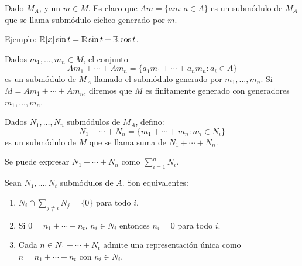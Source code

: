\begin{df}
  Dado \(M_A\), y un \(m\in M\). Es claro que
  \(Am=\{am:a\in A\}\) es un submódulo de \(M_A\) que se llama submódulo
  cíclico generado por \(m\).
\end{df}

Ejemplo: \(\mathbb{R}[x]\sin t=\mathbb{R}\sin t+\mathbb{R}\cos t\).

\begin{df}
  Dados \(m_1,\ldots, m_n\in M\), el conjunto
  \[
    Am_1+\cdots+Am_n=\{a_1 m_1+\cdots+a_n m_n: a_i\in A\}
  \]
  es un submódulo de \(M_A\) llamado el submódulo generado por
  \(m_1,\ldots, m_n\).
  Si \(M=Am_1+\cdots+Am_n\), diremos que \(M\) es finitamente generado
  con generadores
  \(m_1,\ldots, m_n\).
\end{df}

\begin{df}
  Dados \(N_1,\ldots, N_n\) submódulos de \(M_A\), defino:
  \[
    N_1+\cdots+ N_n=\{m_1+\cdots+m_n: m_i\in N_i\}
  \]
  es un submódulo de \(M\) que se llama suma de \(N_1+\cdots+N_n\).
\end{df}

\begin{nt}
  Se puede expresar \(N_1+\cdots+ N_n\) como \(\sum_{i=1}^n N_i\).
\end{nt}

\begin{prop}
  Sean \(N_1,\ldots, N_t\) submódulos de \(A\). Son equivalentes:
  \begin{enumerate}
    \item \(N_i\cap\sum_{j\neq i}N_j =\{0\}\) para todo \(i\).
    \item Si \(0=n_1+\cdots+n_t\), \(n_i\in N_i\) entonces \(n_i=0\)
      para todo \(i\).
    \item Cada \(n\in N_1+\cdots+N_t\) admite una representación
      única como \(n=n_1+\cdots+n_t\) con \(n_i\in N_i\).
  \end{enumerate}
\end{prop}
